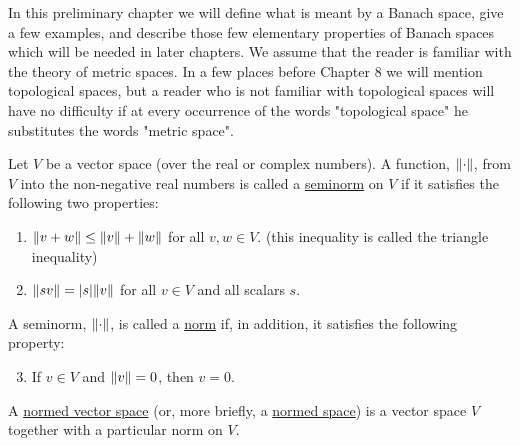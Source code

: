 
In this preliminary chapter we will define what is meant by a Banach space, give a few examples, and describe those few elementary properties of Banach spaces which will be needed in later chapters. We assume that the reader is familiar with the theory of metric spaces. In a few places before Chapter 8 we will mention topological spaces, but a reader who is not familiar with topological spaces will have no difficulty if at every occurrence of the words "topological space" he substitutes the words "metric space".

\begin{definition} Let $V$ be a vector space (over the real or complex numbers). A function, $\norm{\cdot}$, from $V$ into the non-negative real numbers is called a \underline{seminorm} on $V$ if it satisfies the following two properties:
\begin{enumerate}[label=\alph*)]
    \item $\norm{v+w}\leq\norm{v}+\norm{w}$ for all $v,w\in V$. (this inequality is called the triangle inequality)
    \item $\norm{sv}=|s|\norm{v}$ for all $v\in V$ and all scalars $s$.
\end{enumerate}
A seminorm, $\norm{\cdot}$, is called a \underline{norm} if, in addition, it satisfies the following property:
\begin{enumerate}[label=\alph*)]
    \setcounter{enumi}{2}
    \item If $v\in V$ and $\norm{v}=0$, then $v=0$.
\end{enumerate}
\end{definition}

\begin{definition}
A \underline{normed vector space} (or, more briefly, a \underline{normed space}) is a vector space $V$ together with a particular norm on $V$.
\end{definition}

